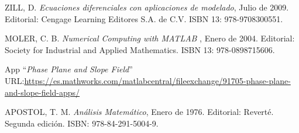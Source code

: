 \documentclass[12pt,a4paper]{report} %
\begin{document}
\begin{thebibliography}{99}
		 ZILL, D. \textit{Ecuaciones diferenciales con aplicaciones de modelado}, Julio de 2009. Editorial: Cengage Learning Editores S.A. de C.V. ISBN 13: 978-9708300551.
		
		\newpage
		
		 MOLER, C. B. \textit{Numerical Computing with MATLAB }, Enero de 2004. Editorial: Society for Industrial and Applied Mathematics. ISBN 13: 978-0898715606.
		
		 App ``\textit{Phase Plane and Slope Field}''
		\\URL:\hspace{1mm}\href{https://es.mathworks.com/matlabcentral/fileexchange/91705-phase-plane-and-slope-field-apps/}{https://es.mathworks.com/matlabcentral/fileexchange/91705-phase-plane-and-slope-field-apps/}
		
		 APOSTOL, T. M. \textit{Análisis Matemático}, Enero de 1976. Editorial: Reverté. Segunda edición. ISBN: 978-84-291-5004-9.
		
	\end{thebibliography}
	
\end{document}

